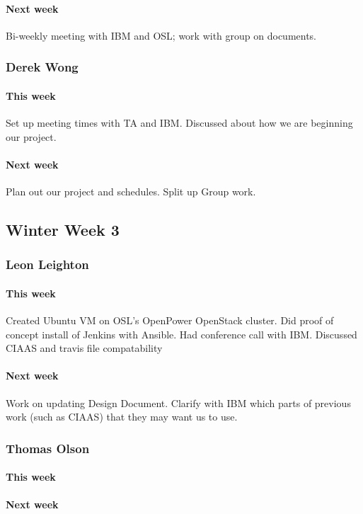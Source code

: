 \documentclass[10pt,letterpaper,onecolumn,draftclsnofoot]{IEEEtran}
\begin{document}
\paragraph{Next week}Bi-weekly meeting with IBM and OSL; work with group on documents.


\subsubsection{Derek Wong}
\paragraph{This week}Set up meeting times with TA and IBM\@.
Discussed about how we are beginning our project.
\paragraph{Next week}Plan out our project and schedules.
Split up Group work.

\subsection{Winter Week 3}
\subsubsection{Leon Leighton}
\paragraph{This week}Created Ubuntu VM on OSL's OpenPower OpenStack cluster.  
Did proof of concept install of Jenkins with Ansible.  
Had conference call with IBM. Discussed CIAAS and travis file compatability 
\paragraph{Next week}Work on updating Design Document. 
Clarify with IBM which parts of previous work (such as CIAAS) that they may want us to use.


\subsubsection{Thomas Olson}
\paragraph{This week}
\paragraph{Next week}
\end{document}
